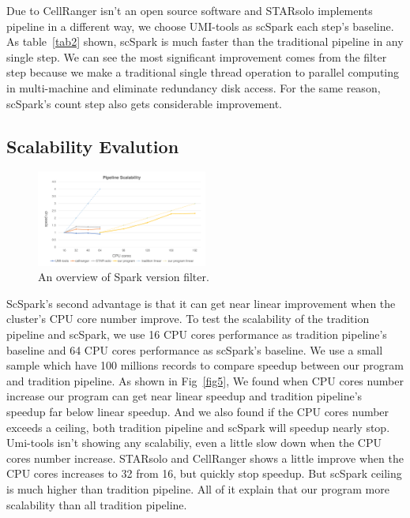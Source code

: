 \documentclass[conference]{IEEEtran}
\begin{document}
Due to CellRanger isn't an open source software and STARsolo implements pipeline in a different way, we choose UMI-tools as scSpark each step's baseline.
As table~\ref{tab2} shown, scSpark is much faster than the traditional pipeline in any single step.
We can see the most significant improvement comes from the filter step because we make a traditional single thread operation to parallel computing in multi-machine and eliminate redundancy disk access.
For the same reason, scSpark's count step also gets considerable improvement.

\subsection{Scalability Evalution}
\begin{figure}
  \includegraphics[width=0.5\textwidth]{fig4.pdf}
  \caption{An overview of Spark version filter.} \label{fig4}
\end{figure}
ScSpark's second advantage is that it can get near linear improvement when the cluster's CPU core number improve. 
To test the scalability of the tradition pipeline and scSpark, we use 16 CPU cores performance as tradition pipeline's baseline and 64 CPU cores performance as scSpark's baseline. 
We use a small sample which have 100 millions records to compare speedup between our program and tradition pipeline. 
As shown in Fig~\ref{fig5}, We found when CPU cores number increase our program can get near linear speedup and tradition pipeline's speedup far below linear speedup. 
And we also found if the CPU cores number exceeds a ceiling, both tradition pipeline and scSpark will speedup nearly stop. 
Umi-tools isn't showing any scalabiliy, even a little slow down when the CPU cores number increase. 
STARsolo and CellRanger shows a little improve when the CPU cores increases to 32 from 16, but quickly stop speedup. 
But scSpark ceiling is much higher than tradition pipeline. 
All of it explain that our program more scalability than all tradition pipeline. 
\end{document}
